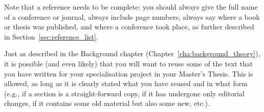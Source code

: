 Note that a reference needs to be complete: you should always give the full name of a conference or journal,
always include page numbers, always say where a book or thesis was published, and where a conference took place, as further described in Section~\ref{sec:reference_list}.

Just as described in the Background chapter (Chapter~\ref{cha:background_theory}), it is possible (and even likely) that you will want to reuse some of the text that you have written for your specialisation project in your Master's Thesis.
This is allowed, as long as it is clearly stated what you have reused and in what form (e.g., if a section is a straight-forward copy, if it has undergone only editorial changes, if it contains some old material but also some new, etc.).

\glsresetall